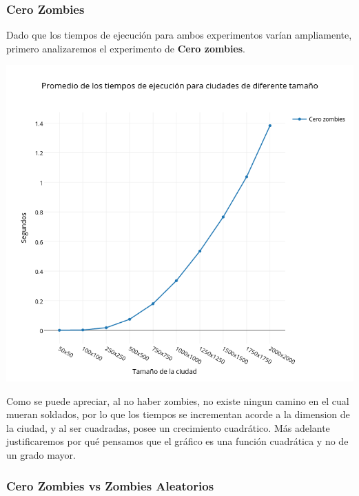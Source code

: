 \subsubsection*{Cero Zombies}

Dado que los tiempos de ejecución para ambos experimentos varían ampliamente, primero analizaremos el experimento de \textbf{Cero zombies}.

\includegraphics[width=15cm,keepaspectratio=yes]{imagenes/ej2/czneto.png}

Como se puede apreciar, al no haber zombies, no existe ningun camino en el cual mueran soldados, por lo que los tiempos se incrementan acorde a la dimension de la ciudad, y al ser cuadradas, posee un crecimiento cuadrático. Más adelante justificaremos por qué pensamos que el gráfico es una función cuadrática y no de un grado mayor.

\newpage

\subsubsection*{Cero Zombies vs Zombies Aleatorios}

